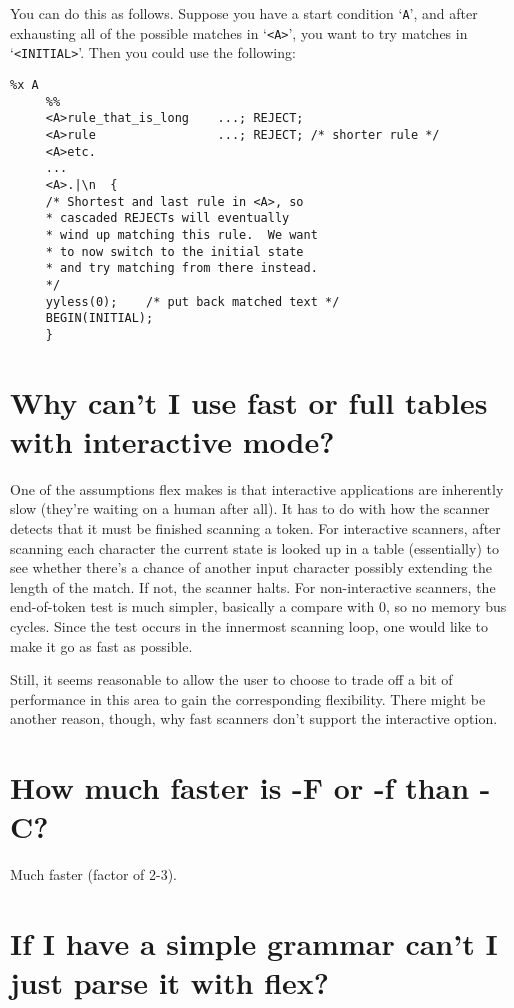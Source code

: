 \documentclass[openany,oneside]{book}
\begin{document}
You can do this as follows.  Suppose you have a start condition ‘\verb`A`’, and
after exhausting all of the possible matches in ‘\verb`<A>`’, you want to try
matches in ‘\verb`<INITIAL>`’.  Then you could use the following:
\begin{verbatim}
%x A
     %%
     <A>rule_that_is_long    ...; REJECT;
     <A>rule                 ...; REJECT; /* shorter rule */
     <A>etc.
     ...
     <A>.|\n  {
     /* Shortest and last rule in <A>, so
     * cascaded REJECTs will eventually
     * wind up matching this rule.  We want
     * to now switch to the initial state
     * and try matching from there instead.
     */
     yyless(0);    /* put back matched text */
     BEGIN(INITIAL);
     }
\end{verbatim}

\section{Why can't I use fast or full tables with interactive mode?}


One of the assumptions
flex makes is that interactive applications are inherently slow (they're
waiting on a human after all). 
It has to do with how the scanner detects that it must be finished scanning
a token.  For interactive scanners, after scanning each character the current
state is looked up in a table (essentially) to see whether there's a chance
of another input character possibly extending the length of the match.  If
not, the scanner halts.  For non-interactive scanners, the end-of-token test
is much simpler, basically a compare with 0, so no memory bus cycles.  Since
the test occurs in the innermost scanning loop, one would like to make it go
as fast as possible.

Still, it seems reasonable to allow the user to choose to trade off a bit
of performance in this area to gain the corresponding flexibility.  There
might be another reason, though, why fast scanners don't support the
interactive option.
\section{How much faster is -F or -f than -C?}


Much faster (factor of 2-3).
\section{If I have a simple grammar can't I just parse it with flex?}
\end{document}
